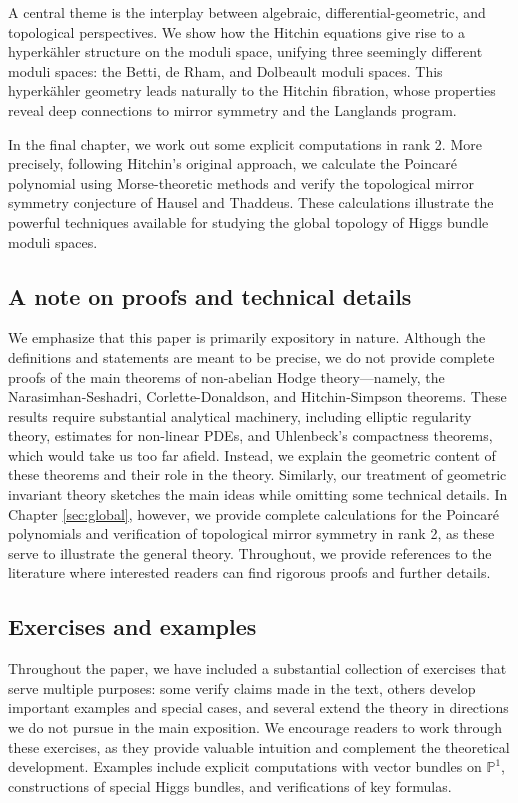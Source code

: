 \documentclass[12pt,a4paper]{amsbook}
\theoremstyle{remark} \newtheorem{rmk}[thm]{Remark}
\theoremstyle{definition} \newtheorem{defn}[thm]{Definition}
\theoremstyle{definition} \newtheorem{ex}[thm]{Example}
\theoremstyle{definition} \newtheorem{ej}{Exercise}
\newcommand{\bbP}{\mathbb P}
\begin{document}
A central theme is the interplay between algebraic, differential-geometric, and topological perspectives. We show how the Hitchin equations give rise to a hyperkähler structure on the moduli space, unifying three seemingly different moduli spaces: the Betti, de Rham, and Dolbeault moduli spaces. This hyperkähler geometry leads naturally to the Hitchin fibration, whose properties reveal deep connections to mirror symmetry and the Langlands program.

In the final chapter, we work out some explicit computations in rank 2. More precisely, following Hitchin's original approach, we calculate the Poincaré polynomial using Morse-theoretic methods and verify the topological mirror symmetry conjecture of Hausel and Thaddeus. These calculations illustrate the powerful techniques available for studying the global topology of Higgs bundle moduli spaces.

\subsection*{A note on proofs and technical details} We emphasize that this paper is primarily expository in nature. Although the definitions and statements are meant to be precise, we do not provide complete proofs of the main theorems of non-abelian Hodge theory—namely, the Narasimhan-Seshadri, Corlette-Donaldson, and Hitchin-Simpson theorems. These results require substantial analytical machinery, including elliptic regularity theory, estimates for non-linear PDEs, and Uhlenbeck's compactness theorems, which would take us too far afield. Instead, we explain the geometric content of these theorems and their role in the theory. Similarly, our treatment of geometric invariant theory sketches the main ideas while omitting some technical details. In Chapter \ref{sec:global}, however, we provide complete calculations for the Poincaré polynomials and verification of topological mirror symmetry in rank 2, as these serve to illustrate the general theory. Throughout, we provide references to the literature where interested readers can find rigorous proofs and further details.

\subsection*{Exercises and examples} Throughout the paper, we have included a substantial collection of exercises that serve multiple purposes: some verify claims made in the text, others develop important examples and special cases, and several extend the theory in directions we do not pursue in the main exposition. We encourage readers to work through these exercises, as they provide valuable intuition and complement the theoretical development. Examples include explicit computations with vector bundles on $\bbP^1$, constructions of special Higgs bundles, and verifications of key formulas.
\end{document}
